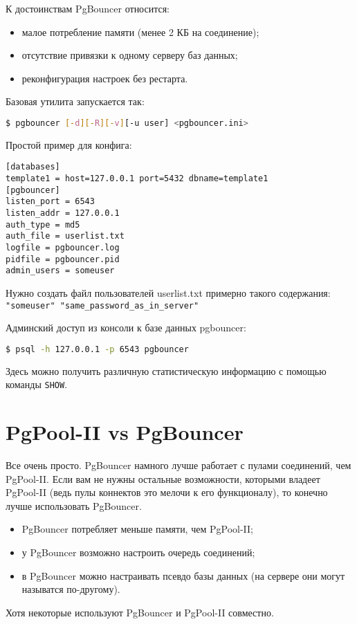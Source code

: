 К достоинствам PgBouncer относится:

\begin{itemize}
  \item малое потребление памяти (менее 2 КБ на соединение);
  \item отсутствие привязки к одному серверу баз данных;
  \item реконфигурация настроек без рестарта.
\end{itemize}

Базовая утилита запускается так:

\begin{lstlisting}[language=Bash,label=lst:pgbouncer1,caption=PgBouncer]
$ pgbouncer [-d][-R][-v][-u user] <pgbouncer.ini>
\end{lstlisting}

Простой пример для конфига:

\begin{lstlisting}[label=lst:pgbouncer2,caption=PgBouncer]
[databases]
template1 = host=127.0.0.1 port=5432 dbname=template1
[pgbouncer]
listen_port = 6543
listen_addr = 127.0.0.1
auth_type = md5
auth_file = userlist.txt
logfile = pgbouncer.log
pidfile = pgbouncer.pid
admin_users = someuser
\end{lstlisting}

Нужно создать файл пользователей userlist.txt примерно такого содержания: \lstinline!"someuser" "same_password_as_in_server"!

Админский доступ из консоли к базе данных pgbouncer:

\begin{lstlisting}[language=Bash,label=lst:pgbouncer3,caption=PgBouncer]
$ psql -h 127.0.0.1 -p 6543 pgbouncer
\end{lstlisting}

Здесь можно получить различную статистическую информацию с помощью команды \lstinline!SHOW!.

\section{PgPool-II vs PgBouncer}

Все очень просто. PgBouncer намного лучше работает с пулами соединений, чем PgPool-II. Если вам не нужны остальные возможности, которыми владеет PgPool-II (ведь пулы коннектов это мелочи к его функционалу), то конечно лучше использовать PgBouncer.

\begin{itemize}
  \item PgBouncer потребляет меньше памяти, чем PgPool-II;
  \item у PgBouncer возможно настроить очередь соединений;
  \item в PgBouncer можно настраивать псевдо базы данных (на сервере они могут называтся по-другому).
\end{itemize}

Хотя некоторые используют PgBouncer и PgPool-II совместно.
